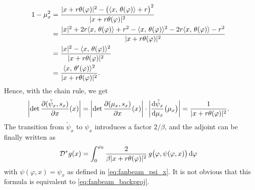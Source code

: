 \documentclass{amsart}
\renewcommand*{\phi}{\varphi}
\begin{document}
\begin{example}
\begin{align*}
  1 - \mu_x^2 
  &= \frac{\ABS{x + r\theta(\phi)}^2 - \big(\INNER{x}{\theta(\phi)} + r\big)^2}{\ABS{x + r\theta(\phi)}^2} \\
  &= \frac{\ABS{x}^2 + 2r \INNER{x}{\theta(\phi)} + r^2 - \INNER{x}{\theta(\phi)}^2 - 2r\INNER{x}{\theta(\phi)} - r^2}{\ABS{x + 
  r\theta(\phi)}^2} \\
  &= \frac{\ABS{x}^2 - \INNER{x}{\theta(\phi)}^2}{\ABS{x + r\theta(\phi)}^2} \\
  &= \frac{\INNER{x}{\theta'(\phi)}^2}{\ABS{x + r\theta(\phi)}^2}.
 \end{align*}
 Hence, with the chain rule, we get
 \begin{equation*}
  \ABSLR{\DET \frac{\partial(\tilde\psi_x, s_x)}{\partial x} (x)} = \ABSLR{\DET \frac{\partial(\mu_x, s_x)}{\partial x} (x)} \cdot
  \ABSLR{\frac{\D \tilde\psi_x}{\D \mu_x}\big(\mu_x\big)} = \frac{1}{\ABS{x + r\theta(\phi)}^2}.
 \end{equation*}
 The transition from $\tilde\psi_x$ to $\psi_x$ introduces a factor $2/\beta$, and the adjoint can be finally written as
 \begin{equation}
  \label{eq:fanbeam_backproj_alt}
  \OPD^* g(x) = \int_0^{\phi_0} \frac{2}{\beta \ABS{x + r\theta(\phi)}^2}\, g\big(\phi, \psi(\phi, x)\big)\, \D \phi
 \end{equation}
 with $\psi(\phi, x) = \psi_x$ as defined in \eqref{eq:fanbeam_psi_x}. It is not obvious that this formula is equivalent to 
 \eqref{eq:fanbeam_backproj}.
\end{example}
\end{document}

